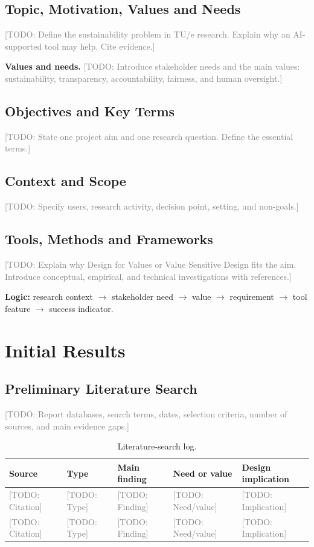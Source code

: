 \documentclass[11pt,a4paper]{article}
\newcommand{\placeholder}[1]{\textcolor{gray}{[TODO: #1]}}
\begin{document}
\subsection{Topic, Motivation, Values and Needs}
\placeholder{Define the sustainability problem in TU/e research. Explain why an AI-supported tool may help. Cite evidence.}

\textbf{Values and needs.}
\placeholder{Introduce stakeholder needs and the main values: sustainability, transparency, accountability, fairness, and human oversight.}

\subsection{Objectives and Key Terms}
\placeholder{State one project aim and one research question. Define the essential terms.}

\subsection{Context and Scope}
\placeholder{Specify users, research activity, decision point, setting, and non-goals.}

\subsection{Tools, Methods and Frameworks}
\placeholder{Explain why Design for Values or Value Sensitive Design fits the aim. Introduce conceptual, empirical, and technical investigations with references.}

\textbf{Logic:} research context $\rightarrow$ stakeholder need $\rightarrow$ value $\rightarrow$ requirement $\rightarrow$ tool feature $\rightarrow$ success indicator.

\section{Initial Results}

\subsection{Preliminary Literature Search}
\placeholder{Report databases, search terms, dates, selection criteria, number of sources, and main evidence gaps.}

\begin{table}[htbp]
\centering
\caption{Literature-search log.}
\small
\begin{tabularx}{\textwidth}{@{}p{}p{}XXp{}@{}}
\toprule
Source & Type & Main finding & Need or value & Design implication \\
\midrule
\placeholder{Citation} & \placeholder{Type} & \placeholder{Finding} & \placeholder{Need/value} & \placeholder{Implication} \\
\placeholder{Citation} & \placeholder{Type} & \placeholder{Finding} & \placeholder{Need/value} & \placeholder{Implication} \\
\bottomrule
\end{tabularx}
\end{table}
\end{document}
